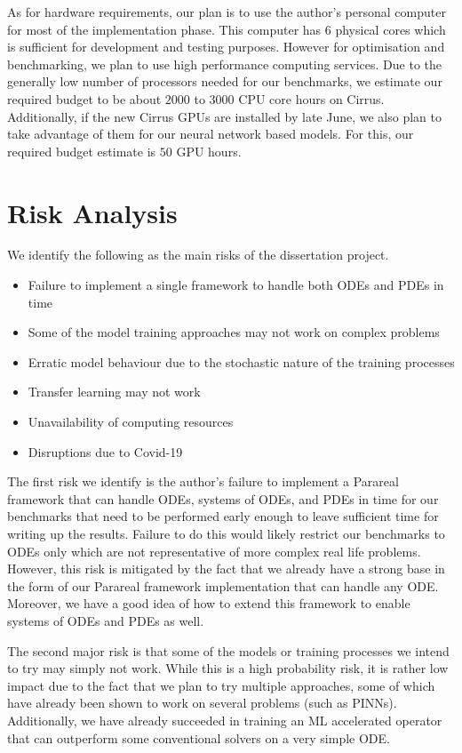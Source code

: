 \documentclass{article}
\begin{document}
As for hardware requirements, our plan is to use the author's personal computer for most of the implementation phase. This computer has $6$ physical cores which is sufficient for development and testing purposes. However for optimisation and benchmarking, we plan to use high performance computing services. Due to the generally low number of processors needed for our benchmarks, we estimate our required budget to be about $2000$ to $3000$ CPU core hours on Cirrus. Additionally, if the new Cirrus GPUs are installed by late June, we also plan to take advantage of them for our neural network based models. For this, our required budget estimate is $50$ GPU hours.

\section{Risk Analysis}

We identify the following as the main risks of the dissertation project.

\begin{itemize}
    \item Failure to implement a single framework to handle both ODEs and PDEs in time
    \item Some of the model training approaches may not work on complex problems
    \item Erratic model behaviour due to the stochastic nature of the training processes
    \item Transfer learning may not work
    \item Unavailability of computing resources
    \item Disruptions due to Covid-19
\end{itemize}

The first risk we identify is the author's failure to implement a Parareal framework that can handle ODEs, systems of ODEs, and PDEs in time for our benchmarks that need to be performed early enough to leave sufficient time for writing up the results. Failure to do this would likely restrict our benchmarks to ODEs only which are not representative of more complex real life problems. However, this risk is mitigated by the fact that we already have a strong base in the form of our Parareal framework implementation that can handle any ODE. Moreover, we have a good idea of how to extend this framework to enable systems of ODEs and PDEs as well.

The second major risk is that some of the models or training processes we intend to try may simply not work. While this is a high probability risk, it is rather low impact due to the fact that we plan to try multiple approaches, some of which have already been shown to work on several problems (such as PINNs). Additionally, we have already succeeded in training an ML accelerated operator that can outperform some conventional solvers on a very simple ODE.
\end{document}

